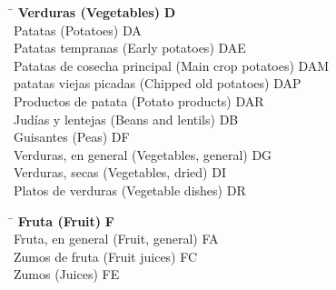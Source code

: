 \begin{small}
    \begin{tabbing}
    \hspace{15cm} \= \hspace{0cm} \kill
        \textbf{Verduras (Vegetables)} \> \textbf{D} \\
            \hspace{0.5cm}Patatas (Potatoes) \> DA \\
                \hspace{1cm}Patatas tempranas (Early potatoes) \> DAE \\
                \hspace{1cm}Patatas de cosecha principal (Main crop potatoes) \> DAM \\
                \hspace{1cm}patatas viejas picadas (Chipped old potatoes) \> DAP \\
                \hspace{1cm}Productos de patata (Potato products) \> DAR \\
            \hspace{0.5cm}Judías y lentejas (Beans and lentils) \> DB \\
            \hspace{0.5cm}Guisantes (Peas) \> DF \\
            \hspace{0.5cm}Verduras, en general (Vegetables, general) \> DG \\
            \hspace{0.5cm}Verduras, secas (Vegetables, dried) \> DI \\
            \hspace{0.5cm}Platos de verduras (Vegetable dishes) \> DR \\
    \end{tabbing}
    
    \vspace{-1.25cm}

    \begin{tabbing}
    \hspace{15cm} \= \hspace{0cm} \kill
        \textbf{Fruta (Fruit)} \> \textbf{F} \\
            \hspace{0.5cm}Fruta, en general (Fruit, general) \> FA \\
            \hspace{0.5cm}Zumos de fruta (Fruit juices) \> FC \\
            \hspace{0.5cm}Zumos (Juices) \> FE \\
    \end{tabbing}


\end{small}
